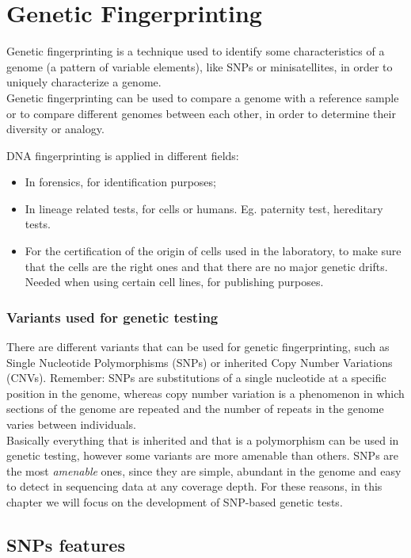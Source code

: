 \graphicspath{{chapters/03/}}

\chapter{Genetic Fingerprinting}
Genetic fingerprinting is a technique used to identify some characteristics of a genome (a pattern of variable elements), like SNPs or minisatellites, in order to uniquely characterize a genome.\\
Genetic fingerprinting can be used to compare a genome with a reference sample or to compare different genomes between each other, in order to determine their diversity or analogy.

DNA fingerprinting is applied in different fields:

\begin{itemize}
	\item In forensics, for identification purposes;
	\item In lineage related tests, for cells or humans. Eg. paternity test, hereditary tests.
	\item For the certification of the origin of cells used in the laboratory, to make sure that the cells are the right ones and that there are no major genetic drifts. Needed when using certain cell lines, for publishing purposes.
\end{itemize}


\subsection{Variants used for genetic testing}
There are different variants that can be used for genetic fingerprinting, such as Single Nucleotide Polymorphisms (SNPs) or inherited Copy Number Variations (CNVs).
Remember: SNPs are substitutions of a single nucleotide at a specific position in the genome, whereas copy number variation is a phenomenon in which sections of the genome are repeated and the number of repeats in the genome varies between individuals.\\
Basically everything that is inherited and that is a polymorphism can be used in genetic testing, however some variants are more amenable than others.
SNPs are the most \textit{amenable} ones, since they are simple, abundant in the genome and easy to detect in sequencing data at any coverage depth. For these reasons, in this chapter we will focus on the development of SNP-based genetic tests.

\section{SNPs features}

